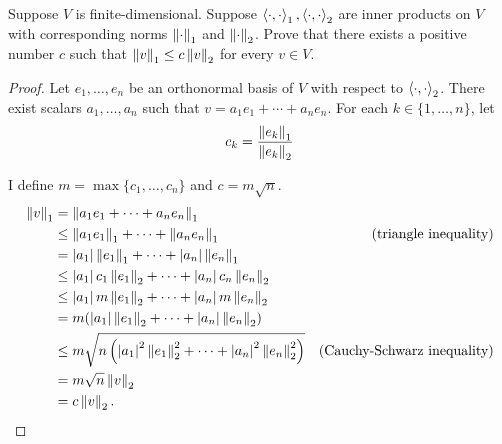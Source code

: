 \begin{exercise}
    Suppose $V$ is finite-dimensional. Suppose $\left\langle{\cdot, \cdot}\right\rangle_{1}, \left\langle{\cdot, \cdot}\right\rangle_{2}$ are inner products on $V$ with corresponding norms $\left\Vert{\cdot}\right\Vert_{1}$ and $\left\Vert{\cdot}\right\Vert_{2}$. Prove that there exists a positive number $c$ such that $\left\Vert{v}\right\Vert_{1}\leq c\left\Vert{v}\right\Vert_{2}$ for every $v \in V$.
\end{exercise}

\begin{proof}
    Let $e_{1}, \ldots, e_{n}$ be an orthonormal basis of $V$ with respect to $\left\langle{\cdot, \cdot}\right\rangle_{2}$. There exist scalars $a_{1}, \ldots, a_{n}$ such that $v = a_{1}e_{1} + \cdots + a_{n}e_{n}$. For each $k\in \{ 1, \ldots, n \}$, let
    \[
        c_{k} = \frac{\left\Vert{e_{k}}\right\Vert_{1}}{\left\Vert{e_{k}}\right\Vert_{2}}
    \]

    I define $m = \max\{ c_{1}, \ldots, c_{n} \}$ and $c = m\sqrt{n}$.
    \begin{align*}
        \left\Vert{v}\right\Vert_{1} & = \left\Vert{a_{1}e_{1} + \cdots + a_{n}e_{n}}\right\Vert_{1}                                                                                                       \\
                     & \leq \left\Vert{a_{1}e_{1}}\right\Vert_{1} + \cdots + \left\Vert{a_{n}e_{n}}\right\Vert_{1}                                                    & \text{(triangle inequality)}       \\
                     & = \left\vert{a_{1}}\right\vert\left\Vert{e_{1}}\right\Vert_{1} + \cdots + \left\vert{a_{n}}\right\vert\left\Vert{e_{n}}\right\Vert_{1}                                                                                \\
                     & \leq \left\vert{a_{1}}\right\vert c_{1}\left\Vert{e_{1}}\right\Vert_{2} + \cdots + \left\vert{a_{n}}\right\vert c_{n}\left\Vert{e_{n}}\right\Vert_{2}                                                                  \\
                     & \leq \left\vert{a_{1}}\right\vert m\left\Vert{e_{1}}\right\Vert_{2} + \cdots + \left\vert{a_{n}}\right\vert m\left\Vert{e_{n}}\right\Vert_{2}                                                                          \\
                     & = m (\left\vert{a_{1}}\right\vert \left\Vert{e_{1}}\right\Vert_{2} + \cdots + \left\vert{a_{n}}\right\vert\left\Vert{e_{n}}\right\Vert_{2})                                                                           \\
                     & \leq m \sqrt{n\left(\left\vert{a_{1}}\right\vert^{2}\left\Vert{e_{1}}\right\Vert_{2}^{2} + \cdots + \left\vert{a_{n}}\right\vert^{2}\left\Vert{e_{n}}\right\Vert_{2}^{2}\right)} & \text{(Cauchy-Schwarz inequality)} \\
                     & = m\sqrt{n}\left\Vert{v}\right\Vert_{2}                                                                                                                             \\
                     & = c\left\Vert{v}\right\Vert_{2}.
    \end{align*}
\end{proof}
\newpage

